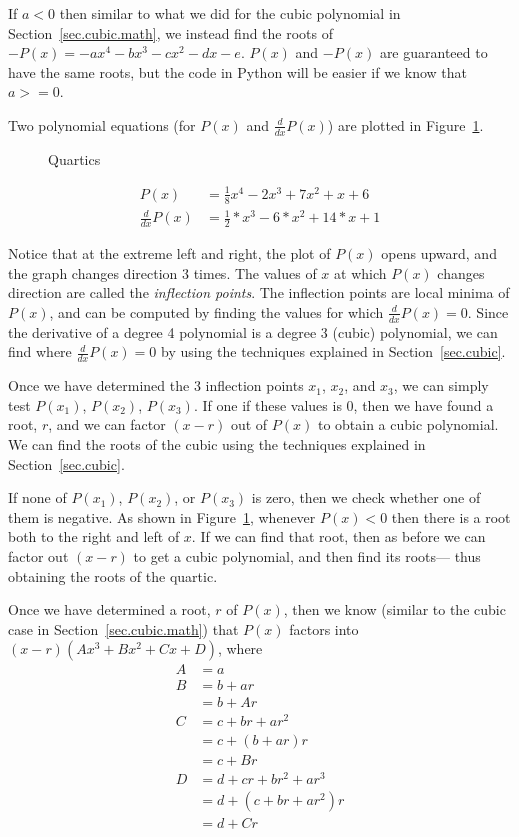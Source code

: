 If $a<0$ then similar to what we did for the cubic polynomial in
Section~\ref{sec.cubic.math}, we instead find the roots of
$-P(x) = -a x^4 - b x^3 - c x^2 - d x - e$.  $P(x)$ and $-P(x)$ are guaranteed to
have the same roots, but the code in Python will be easier if we know
that $a >= 0$.


Two polynomial equations (for $P(x)$ and $\frac{d}{dx} P(x)$) are
plotted in Figure~\ref{fig.quartic}.

\begin{figure}
\centering

\caption{Quartics}
\label{fig.quartic}
\end{figure}

\begin{align*}
  P(x) &= \frac{1}{8}  x^4 -2 x^3 + 7  x^2 + x + 6\\
  \frac{d}{dx} P(x) &= \frac{1}{2} * x^3 -6* x^2 + 14 * x + 1
\end{align*}

Notice that at the extreme left and right, the plot of $P(x)$ opens
upward, and the graph changes direction 3 times.  The values of $x$ at
which $P(x)$ changes direction are called the \emph{inflection
points}.  The inflection points are local minima of $P(x)$, and can
be computed by finding the values for which $\frac{d}{dx} P(x) = 0$.
Since the derivative of a degree 4 polynomial is a degree 3 (cubic)
polynomial, we can find where $\frac{d}{dx} P(x) = 0$ by using the
techniques explained in Section~\ref{sec.cubic}.

Once we have determined the 3 inflection points $x_1$, $x_2$, and $x_3$, we can
simply test $P(x_1)$, $P(x_2)$, $P(x_3)$.  If one if these values is 0, then
we have found a root, $r$, and we can factor $(x-r)$ out of $P(x)$ to obtain
a cubic polynomial.  We can find the roots of the cubic using the techniques
explained in Section~\ref{sec.cubic}.

If none of $P(x_1)$, $P(x_2)$, or $P(x_3)$ is zero, then we check
whether one of them is negative.  As shown in
Figure~\ref{fig.quartic}, whenever $P(x)<0$ then there is a root both
to the right and left of $x$.  If we can find that root, then as before
we can factor out $(x-r)$ to get a cubic polynomial, and then find its roots---
thus obtaining the roots of the quartic.

Once we have determined a root, $r$ of $P(x)$, then we know (similar
to the cubic case in Section~\ref{sec.cubic.math}) that $P(x)$ factors
into $(x-r)(Ax^3 + Bx^2 + Cx + D)$, where
\begin{align}
  A &= a\label{eq.7.A}\\
  B &= b + a r\nonumber\\
   &= b + A r\label{eq.7.B}\\
  C &= c + b r + a r^2\nonumber\\
  &= c + (b + a r)r\nonumber\\
  &= c + B r\label{eq.7.C}\\
  D &= d + c r + b r^2 + a r^3\nonumber\\
  &= d + ( c + b r + a r^2)r\nonumber\\
  &= d + C r\label{eq.7.D}
\end{align}

